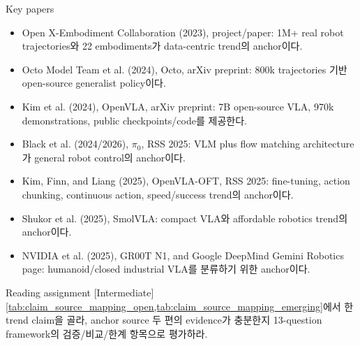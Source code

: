 \begin{sourcebox}{Key papers}
\begin{itemize}
  \item Open X-Embodiment Collaboration (2023), project/paper: 1M+ real robot trajectories와 22 embodiments가 data-centric trend의 anchor이다.
  \item Octo Model Team et al. (2024), Octo, arXiv preprint: 800k trajectories 기반 open-source generalist policy이다.
  \item Kim et al. (2024), OpenVLA, arXiv preprint: 7B open-source VLA, 970k demonstrations, public checkpoints/code를 제공한다.
  \item Black et al. (2024/2026), \(\pi_0\), RSS 2025: VLM plus flow matching architecture가 general robot control의 anchor이다.
  \item Kim, Finn, and Liang (2025), OpenVLA-OFT, RSS 2025: fine-tuning, action chunking, continuous action, speed/success trend의 anchor이다.
  \item Shukor et al. (2025), SmolVLA: compact VLA와 affordable robotics trend의 anchor이다.
  \item NVIDIA et al. (2025), GR00T N1, and Google DeepMind Gemini Robotics page: humanoid/closed industrial VLA를 분류하기 위한 anchor이다.
\end{itemize}
\end{sourcebox}

\begin{assignmentbox}{Reading assignment [Intermediate]}
\cref{tab:claim_source_mapping_open,tab:claim_source_mapping_emerging}에서 한 trend claim을 골라, anchor source 두 편의 evidence가 충분한지 13-question framework의 검증/비교/한계 항목으로 평가하라.
\end{assignmentbox}

